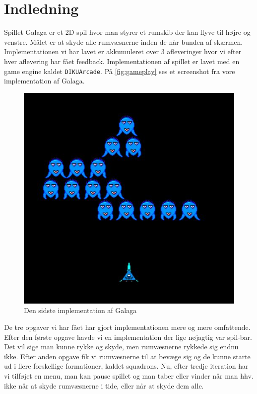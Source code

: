 

\section{Indledning}
Spillet Galaga er et 2D spil hvor man styrer et rumskib der kan flyve til højre og venstre. Målet er at skyde alle rumvæsnerne inden de når bunden af skærmen. Implementationen vi har lavet er akkumuleret over 3 afleveringer hvor vi efter hver aflevering har fået feedback. Implementationen af spillet er lavet med en game engine kaldet \texttt{DIKUArcade}. På \autoref{fig:gameplay} ses et screenshot fra vore implementation af Galaga.
\begin{figure}[!ht]
  \center
  \includegraphics[scale=0.3]{latex/GamePlay}
  \caption{Den sidste implementation af Galaga}
  \label{fig:gameplay}
\end{figure}
De tre opgaver vi har fået har gjort implementationen mere og mere omfattende. Efter den første opgave havde vi en implementation der lige nøjagtig var spil-bar. Det vil sige man kunne rykke og skyde, men rumvæsnerne rykkede sig endnu ikke. Efter anden opgave fik vi rumvæsnerne til at bevæge sig og de kunne starte ud i flere forskellige formationer, kaldet squadrons. Nu, efter tredje iteration har vi tilføjet en menu, man kan pause spillet og man taber eller vinder når man hhv. ikke når at skyde rumvæsnerne i tide, eller når at skyde dem alle.  
